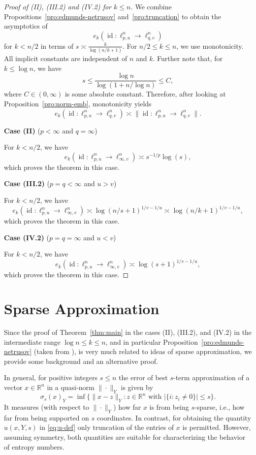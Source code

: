 \documentclass[a4paper,12pt]{article}
\theoremstyle{definition}
\newcommand{\IR}{\mathbb{R}}
\DeclareMathOperator{\id}{id}
\begin{document}
\begin{proof}[Proof of (II), (III.2) and (IV.2) for $k\le n$]

We combine Propositions~\ref{pro:edmunds-netrusov} and~\ref{pro:truncation} to obtain the asymptotics of 
\[
e_k(\id\colon \ell_{p,u}^n\to \ell_{q,v}^n)
\]
for $k<n/2$ in terms of $s\asymp\frac{k}{\log(n/k+1)}$. For $n/2\le k\le n$, we use monotonicity. All implicit constants are independent of $n$ and $k$. Further note that, for $k\le \log n$, we have
\[
s\le\frac{\log n}{\log(1+n/\log n)}\le C,
\]
where $C\in(0,\infty)$ is some absolute constant. Therefore, after looking at Proposition~\ref{pro:norm-emb}, monotonicity yields
\[
e_k(\id\colon \ell_{p,u}^n\to \ell_{q,v}^n)\asymp \|\id\colon \ell_{p,u}^n\to \ell_{q,v}^n\|.
\]

\noindent \textbf{Case (II)} ($p<\infty$ and $q=\infty$)

For $k<n/2$, we have
\[
e_k(\id\colon \ell_{p,u}^n\to \ell_{\infty,v}^n)
\asymp s^{-1/p}\log(s),
\]
which proves the theorem in this case.

\noindent \textbf{Case (III.2)} ($p=q<\infty$ and $u>v$) 

For $k<n/2$, we have 
\[
e_k(\id\colon \ell_{p,u}^n\to \ell_{\infty,v}^n)
\asymp \log(n/s+1)^{1/v-1/u}
\asymp \log(n/k+1)^{1/v-1/u},
\]
which proves the theorem in this case.

\noindent \textbf{Case (IV.2)} ($p=q=\infty$ and $u<v$) 

For $k<n/2$, we have 
\[
e_k(\id\colon \ell_{p,u}^n\to \ell_{\infty,v}^n)
\asymp \log(s+1)^{1/v-1/u},
\]
which proves the theorem in this case.
\end{proof}

\section{Sparse Approximation}\label{sec:sparse}

Since the proof of Theorem~\ref{thm:main} in the cases (II), (III.2), and (IV.2) in the intermediate range $\log n\le k\le n$, and in particular Proposition~\ref{pro:edmunds-netrusov} (taken from \cite[Section 4, Theorem 2]{EN98}), is very much related to ideas of sparse approximation, we provide some background and an alternative proof.

In general, for positive integers $s\le n$ the error of best $s$-term approximation of a vector $x\in\IR^n$ in a quasi-norm $\|\cdot\|_Y$ is given by
\[
\sigma_s(x)_Y=\inf\big\{\|x-z\|_Y\colon z\in\IR^n \text{ with }|\{i\colon z_i\neq 0\}|\le s\big\}.
\]
It measures (with respect to $\|\cdot\|_Y$) how far $x$ is from being $s$-sparse, i.e., how far from being supported on $s$ coordinates. In contrast, for obtaining the quantity $u(x,Y,s)$ in \eqref{eq:u-def} only truncation of the entries of $x$ is permitted. However, assuming symmetry, both quantities are suitable for characterizing the behavior of entropy numbers.
\end{document}
